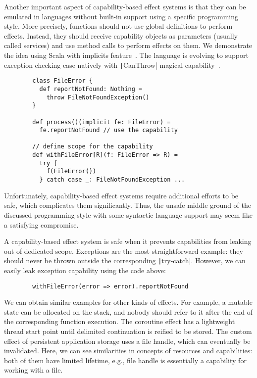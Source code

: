\documentclass[conference]{IEEEtran}
\begin{document}
    Another important aspect of capability-based effect systems is that they can be emulated in languages without built-in support using a specific programming style.
    More precisely, functions should not use global definitions to perform effects.
    Instead, they should receive capability objects as parameters (usually called services) and use method calls to perform effects on them.
    We demonstrate the idea using Scala with implicits feature~\cite{odersky2004scala}.
    The language is evolving to support exception checking case natively with \texttt|CanThrow| magical capability~\cite{odersky2021safer}.
    \begin{verbatim}
        class FileError {
          def reportNotFound: Nothing =
            throw FileNotFoundException()
        }

        def process()(implicit fe: FileError) =
          fe.reportNotFound // use the capability

        // define scope for the capability
        def withFileError[R](f: FileError => R) =
          try {
            f(FileError())
          } catch case _: FileNotFoundException ...
    \end{verbatim}

    Unfortunately, capability-based effect systems require additional efforts to be safe, which complicates them significantly.
    Thus, the unsafe middle ground of the discussed programming style with some syntactic language support may seem like a satisfying compromise.

    A capability-based effect system is safe when it prevents capabilities from leaking out of dedicated scope.
    Exceptions are the most straightforward example: they should never be thrown outside the corresponding \texttt|try-catch|.
    However, we can easily leak exception capability using the code above:
    \begin{verbatim}
        withFileError(error => error).reportNotFound
    \end{verbatim}

    We can obtain similar examples for other kinds of effects.
    For example, a mutable state can be allocated on the stack, and nobody should refer to it after the end of the corresponding function execution.
    The coroutine effect has a lightweight thread start point until delimited continuation is reified to be stored.
    The custom effect of persistent application storage uses a file handle, which can eventually be invalidated.
    Here, we can see similarities in concepts of resources and capabilities: both of them have limited lifetime, e.g., file handle is essentially a capability for working with a file.
\end{document}
